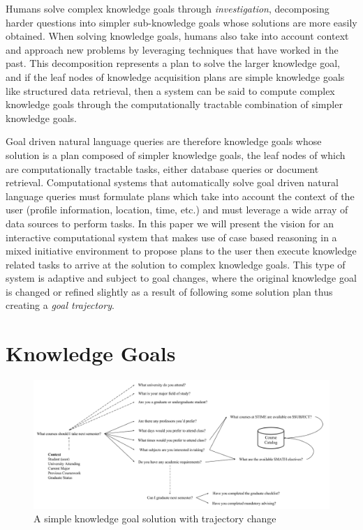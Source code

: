 \documentclass[11pt,letterpaper]{article}
\begin{document}
Humans solve complex knowledge goals through \textit{investigation}, decomposing harder questions into simpler sub-knowledge goals whose solutions are more easily obtained. When solving knowledge goals, humans also take into account context and approach new problems by leveraging techniques that have worked in the past. This decomposition represents a plan to solve the larger knowledge goal, and if the leaf nodes of knowledge acquisition plans are simple knowledge goals like structured data retrieval, then a system can be said to compute complex knowledge goals through the computationally tractable combination of simpler knowledge goals.

Goal driven natural language queries are therefore knowledge goals whose solution is a plan composed of simpler knowledge goals, the leaf nodes of which are computationally tractable tasks, either database queries or document retrieval. Computational systems that automatically solve goal driven natural language queries must formulate plans which take into account the context of the user (profile information, location, time, etc.) and must leverage a wide array of data sources to perform tasks. In this paper we will present the vision for an interactive computational system that makes use of case based reasoning in a mixed initiative environment to propose plans to the user then execute knowledge related tasks to arrive at the solution to complex knowledge goals. This type of system is adaptive and subject to goal changes, where the original knowledge goal is changed or refined slightly as a result of following some solution plan thus creating a \textit{goal trajectory}.

\section{Knowledge Goals}

\begin{figure}
	\centering
	    \includegraphics[width=\textwidth]{figures/simple_trajectory.png}
    \caption{\label{fig:simple_trajectory.png}A simple knowledge goal solution with trajectory change}
\end{figure}
\end{document}
